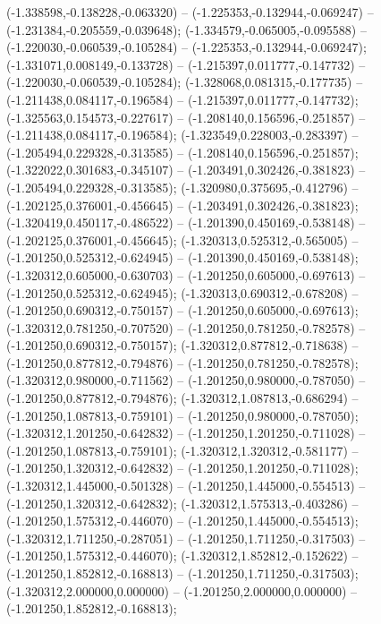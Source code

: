  (-1.338598,-0.138228,-0.063320) -- (-1.225353,-0.132944,-0.069247) -- (-1.231384,-0.205559,-0.039648);
 (-1.334579,-0.065005,-0.095588) -- (-1.220030,-0.060539,-0.105284) -- (-1.225353,-0.132944,-0.069247);
 (-1.331071,0.008149,-0.133728) -- (-1.215397,0.011777,-0.147732) -- (-1.220030,-0.060539,-0.105284);
 (-1.328068,0.081315,-0.177735) -- (-1.211438,0.084117,-0.196584) -- (-1.215397,0.011777,-0.147732);
 (-1.325563,0.154573,-0.227617) -- (-1.208140,0.156596,-0.251857) -- (-1.211438,0.084117,-0.196584);
 (-1.323549,0.228003,-0.283397) -- (-1.205494,0.229328,-0.313585) -- (-1.208140,0.156596,-0.251857);
 (-1.322022,0.301683,-0.345107) -- (-1.203491,0.302426,-0.381823) -- (-1.205494,0.229328,-0.313585);
 (-1.320980,0.375695,-0.412796) -- (-1.202125,0.376001,-0.456645) -- (-1.203491,0.302426,-0.381823);
 (-1.320419,0.450117,-0.486522) -- (-1.201390,0.450169,-0.538148) -- (-1.202125,0.376001,-0.456645);
 (-1.320313,0.525312,-0.565005) -- (-1.201250,0.525312,-0.624945) -- (-1.201390,0.450169,-0.538148);
 (-1.320312,0.605000,-0.630703) -- (-1.201250,0.605000,-0.697613) -- (-1.201250,0.525312,-0.624945);
 (-1.320313,0.690312,-0.678208) -- (-1.201250,0.690312,-0.750157) -- (-1.201250,0.605000,-0.697613);
 (-1.320312,0.781250,-0.707520) -- (-1.201250,0.781250,-0.782578) -- (-1.201250,0.690312,-0.750157);
 (-1.320312,0.877812,-0.718638) -- (-1.201250,0.877812,-0.794876) -- (-1.201250,0.781250,-0.782578);
 (-1.320312,0.980000,-0.711562) -- (-1.201250,0.980000,-0.787050) -- (-1.201250,0.877812,-0.794876);
 (-1.320312,1.087813,-0.686294) -- (-1.201250,1.087813,-0.759101) -- (-1.201250,0.980000,-0.787050);
 (-1.320312,1.201250,-0.642832) -- (-1.201250,1.201250,-0.711028) -- (-1.201250,1.087813,-0.759101);
 (-1.320312,1.320312,-0.581177) -- (-1.201250,1.320312,-0.642832) -- (-1.201250,1.201250,-0.711028);
 (-1.320312,1.445000,-0.501328) -- (-1.201250,1.445000,-0.554513) -- (-1.201250,1.320312,-0.642832);
 (-1.320312,1.575313,-0.403286) -- (-1.201250,1.575312,-0.446070) -- (-1.201250,1.445000,-0.554513);
 (-1.320312,1.711250,-0.287051) -- (-1.201250,1.711250,-0.317503) -- (-1.201250,1.575312,-0.446070);
 (-1.320312,1.852812,-0.152622) -- (-1.201250,1.852812,-0.168813) -- (-1.201250,1.711250,-0.317503);
 (-1.320312,2.000000,0.000000) -- (-1.201250,2.000000,0.000000) -- (-1.201250,1.852812,-0.168813);
